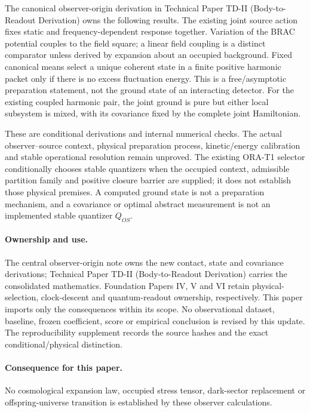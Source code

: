 \documentclass[11pt]{article}
\begin{document}
The canonical observer-origin derivation in Technical Paper TD-II
(Body-to-Readout Derivation) owns the following
results. The existing joint source action fixes static and frequency-dependent
response together. Variation of the BRAC potential couples to the field
square; a linear field coupling is a distinct comparator unless derived by
expansion about an occupied background. Fixed canonical means select a unique
coherent state in a finite positive harmonic packet only if there is no excess
fluctuation energy. This is a free/asymptotic preparation statement, not the
ground state of an interacting detector. For the existing coupled harmonic
pair, the joint ground is pure but either local subsystem is mixed, with its
covariance fixed by the complete joint Hamiltonian.

These are conditional derivations and internal numerical checks. The actual
observer--source context, physical preparation process, kinetic/energy
calibration and stable operational resolution remain unproved. The existing
ORA-T1 selector conditionally chooses stable quantizers when the occupied
context, admissible partition family and positive closure barrier are supplied;
it does not establish those physical premises. A computed ground state is not
a preparation mechanism, and a covariance or optimal abstract measurement is
not an implemented stable quantizer $Q_{OS}$.

\paragraph{Ownership and use.}
The central observer-origin note owns the new contact, state and covariance
derivations; Technical Paper TD-II (Body-to-Readout Derivation) carries the consolidated
mathematics. Foundation Papers IV, V and VI retain physical-selection,
clock-descent and quantum-readout ownership, respectively. This paper imports
only the consequences within its scope. No observational dataset, baseline,
frozen coefficient, score or empirical conclusion is revised by this update.
The reproducibility supplement records the source hashes and the exact
conditional/physical distinction.

\paragraph{Consequence for this paper.}
No cosmological expansion law, occupied stress tensor, dark-sector replacement or offspring-universe transition is established by these observer calculations.
\end{document}
